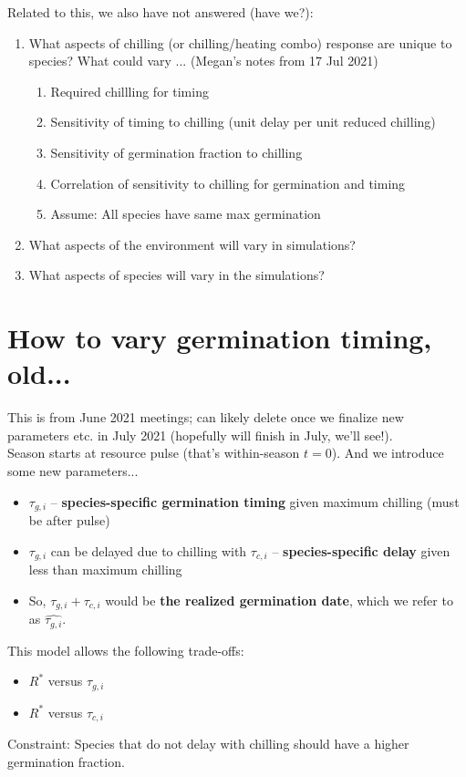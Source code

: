 \documentclass[11pt,letter]{article}
\begin{document}
Related to this, we also have not answered (have we?):
\begin{enumerate}
\item What aspects of chilling (or chilling/heating combo) response are unique to species? What could vary ... (Megan's notes from 17 Jul 2021)
\begin{enumerate}
\item Required chillling for timing
\item Sensitivity of timing to chilling (unit delay per unit reduced chilling)
\item Sensitivity of germination fraction to chilling
\item Correlation of sensitivity to chilling for germination and timing
\item Assume: All species have same max germination
\end{enumerate}
\item What aspects of the environment will vary in simulations?
\item What aspects of species will vary in the simulations?
\end{enumerate}


\section{How to vary germination timing, old...} 

This is from June 2021 meetings; can likely delete once we finalize new parameters etc. in July 2021 (hopefully will finish in July, we'll see!).\\

Season starts at resource pulse (that's within-season $t=0$). And we introduce some new parameters...
\begin{itemize}
\item $\tau_{g,i}$ -- {\bf species-specific germination timing} given maximum chilling (must be after pulse)
\item $\tau_{g,i}$ can be delayed due to chilling with $\tau_{c,i}$ -- {\bf species-specific delay} given less than maximum chilling
\item So, $\tau_{g,i} + \tau_{c,i}$ would be {\bf the realized germination date}, which we refer to as $\hat{\tau_{g,i}}$. 
\end{itemize}

This model allows the following trade-offs:
\begin{itemize}
\item $R^*$ versus $\tau_{g,i}$ 
\item $R^*$ versus $\tau_{c,i}$ 
\end{itemize}
Constraint: Species that do not delay with chilling should have a higher germination fraction.\\
\end{document}
